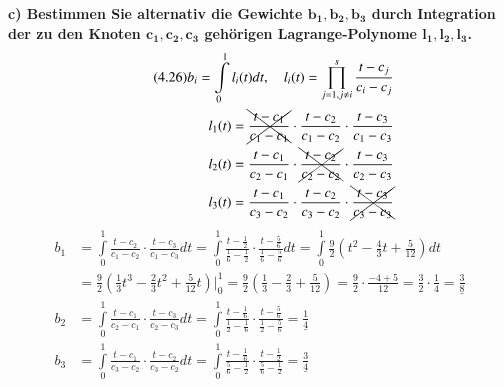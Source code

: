 \documentclass[10pt,a4paper]{article}
\begin{document}
    \textbf{%
        c) Bestimmen Sie alternativ die Gewichte $\mathbf{b_1, b_2, b_3}$ durch Integration der zu den Knoten $\mathbf{c_1, c_2, c_3}$ gehörigen Lagrange-Polynome $\mathbf{l_1, l_2, l_3}$.
    }\\
		\begin{align*}\tag{4.26}
			b_i=\int\limits_{0}^{1}l_i(t)dt, \quad l_i(t)=\prod_{j=1, j\neq i}^{s}\frac{t-c_j}{c_i-c_j} \\
			l_1(t) = \bcancel{\cancel{\frac{t-c_1}{c_1-c_1}}} \cdot \frac{t-c_2}{c_1-c_2} \cdot \frac{t-c_3}{c_1-c_3} \\
			l_2(t) = \frac{t-c_1}{c_2-c_1} \cdot \bcancel{\cancel{\frac{t-c_2}{c_2-c_2}}} \cdot  \frac{t-c_3}{c_2-c_3} \\
			l_3(t) = \frac{t-c_1}{c_3-c_2} \cdot \frac{t-c_2}{c_3-c_2} \cdot  \bcancel{\cancel{\frac{t-c_3}{c_3-c_3}}}
		\end{align*}
		\begin{align*}
			b_1 &= \int\limits_{0}^{1} \frac{t-c_2}{c_1-c_2} \cdot \frac{t-c_3}{c_1-c_3} dt = 
				\int\limits_{0}^{1} \frac{t-\frac{1}{2}}{\frac{1}{6}-\frac{1}{2}} \cdot \frac{t-\frac{5}{6}}{\frac{1}{6}-\frac{5}{6}} dt =
				\int\limits_{0}^{1} \frac{9}{2}\left(t^2-\frac{4}{3}t+\frac{5}{12} \right) dt \\
				&= \frac{9}{2}\left(\frac{1}{3}t^3-\frac{2}{3}t^2+\frac{5}{12}t \right)\biggr\rvert^1_{0} = \frac{9}{2}\left(\frac{1}{3}-\frac{2}{3}+\frac{5}{12} \right) = \frac{9}{2}\cdot \frac{-4+5}{12} = \frac{3}{2}\cdot \frac{1}{4} =\underline{\frac{3}{8}} \\
			b_2 &= \int\limits_{0}^{1} \frac{t-c_1}{c_2-c_1} \cdot \frac{t-c_3}{c_2-c_3} dt = 
				\int\limits_{0}^{1} \frac{t-\frac{1}{6}}{\frac{1}{2}-\frac{1}{6}} \cdot  \frac{t-\frac{5}{6}}{\frac{1}{2}-\frac{5}{6}} = \underline{\frac{1}{4}}\\
			b_3 &= \int\limits_{0}^{1} \frac{t-c_1}{c_3-c_2} \cdot \frac{t-c_2}{c_3-c_2} dt =
				\int\limits_{0}^{1}	\frac{t-\frac{1}{6}}{\frac{5}{6}-\frac{1}{2}} \cdot \frac{t-\frac{1}{2}}{\frac{5}{6}-\frac{1}{2}} = \underline{\frac{3}{4}}
		\end{align*}
		
\end{document}
